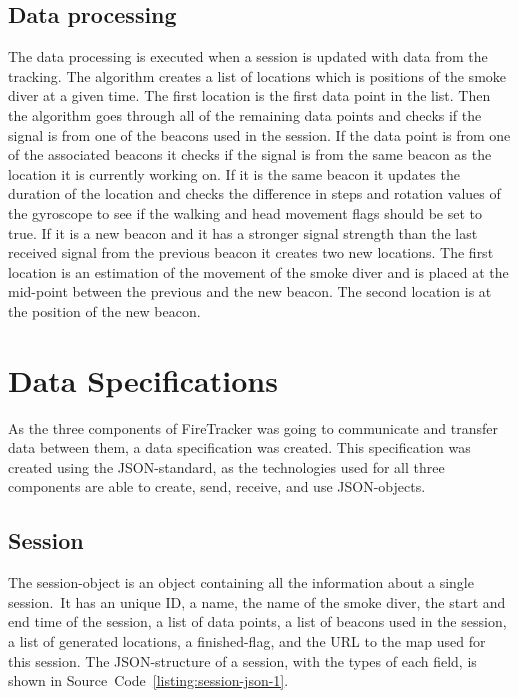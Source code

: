 \documentclass[../Main/thesis.tex]{subfiles}
\begin{document}
\subsection{Data processing}
The data processing is executed when a session is updated with data from the tracking.
The algorithm creates a list of locations which is positions of the smoke diver at a given time.
The first location is the first data point in the list.
Then the algorithm goes through all of the remaining data points and checks if the signal is from one of the beacons used in the session. 
If the data point is from one of the associated beacons it checks if the signal is from the same beacon as the location it is currently working on.
If it is the same beacon it updates the duration of the location and checks the difference in steps and rotation values of the gyroscope to see if the walking and head movement flags should be set to true.
If it is a new beacon and it has a stronger signal strength than the last received signal from the previous beacon it creates two new locations.
The first location is an estimation of the movement of the smoke diver and is placed at the mid-point between the previous and the new beacon.
The second location is at the position of the new beacon.

\section{Data Specifications}
As the three components of FireTracker was going to communicate and transfer data between them, a data specification was created.
This specification was created using the JSON-standard, as the technologies used for all three components are able to create, send, receive, and use JSON-objects.

\subsection{Session}
The session-object is an object containing all the information about a single session.\
It has an unique ID, a name, the name of the smoke diver, the start and end time of the session, a list of data points, a list of beacons used in the session, a list of generated locations, a finished-flag, and the URL to the map used for this session. 
The JSON-structure of a session, with the types of each field, is shown in Source~Code~\ref{listing:session-json-1}.

\end{document}
